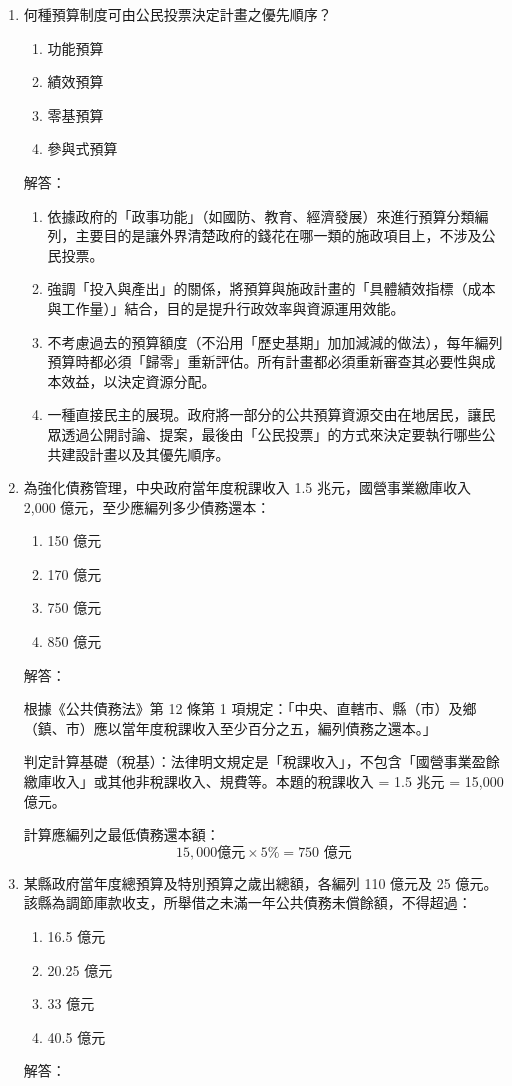 \documentclass[12pt, a4paper]{article}
\begin{document}
\begin{enumerate}
    \item 何種預算制度可由公民投票決定計畫之優先順序？
    \begin{enumerate}[label=\Alph*.]
        \item 功能預算
        \item 績效預算
        \item 零基預算
        \item 參與式預算
    \end{enumerate}
    解答：
    \begin{enumerate}[label=\Alph*.]
        \item 依據政府的「政事功能」（如國防、教育、經濟發展）來進行預算分類編列，主要目的是讓外界清楚政府的錢花在哪一類的施政項目上，不涉及公民投票。
        \item 強調「投入與產出」的關係，將預算與施政計畫的「具體績效指標（成本與工作量）」結合，目的是提升行政效率與資源運用效能。
        \item 不考慮過去的預算額度（不沿用「歷史基期」加加減減的做法），每年編列預算時都必須「歸零」重新評估。所有計畫都必須重新審查其必要性與成本效益，以決定資源分配。
        \item 一種直接民主的展現。政府將一部分的公共預算資源交由在地居民，讓民眾透過公開討論、提案，最後由「公民投票」的方式來決定要執行哪些公共建設計畫以及其優先順序。
    \end{enumerate}

    \item 為強化債務管理，中央政府當年度稅課收入 1.5 兆元，國營事業繳庫收入 2,000 億元，至少應編列多少債務還本：
    \begin{enumerate}[label=\Alph*.]
        \item 150 億元
        \item 170 億元
        \item 750 億元
        \item 850 億元
    \end{enumerate}
    解答：

    根據《公共債務法》第 12 條第 1 項規定：「中央、直轄市、縣（市）及鄉（鎮、市）應以當年度稅課收入至少百分之五，編列債務之還本。」

    判定計算基礎（稅基）：法律明文規定是「稅課收入」，不包含「國營事業盈餘繳庫收入」或其他非稅課收入、規費等。本題的稅課收入 = 1.5 兆元 = 15,000 億元。

    計算應編列之最低債務還本額：
    \[
    15,000 \text{億元} \times 5\% = 750 \text{ 億元}
    \]

    \item 某縣政府當年度總預算及特別預算之歲出總額，各編列 110 億元及 25 億元。該縣為調節庫款收支，所舉借之未滿一年公共債務未償餘額，不得超過：
    \begin{enumerate}[label=\Alph*.]
        \item 16.5 億元
        \item 20.25 億元
        \item 33 億元
        \item 40.5 億元
    \end{enumerate}
    解答：


\end{enumerate}
\end{document}
